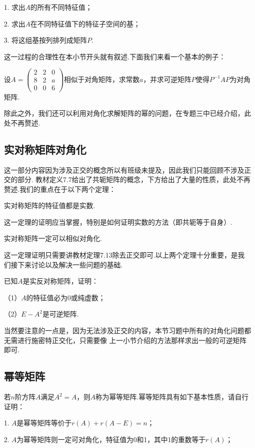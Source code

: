 1. 求出$A$的所有不同特征值；

2. 求出$A$在不同特征值下的特征子空间的基；

3. 将这组基按列排列成矩阵$P$.

这一过程的合理性在本小节开头就有叙述.下面我们来看一个基本的例子：
\begin{example}
	设$A=\begin{pmatrix}
		2 & 2 & 0 \\ 8 & 2 & a \\ 0 & 0 & 6
	\end{pmatrix}$相似于对角矩阵，求常数$a$，并求可逆矩阵$P$使得$P^{-1}AP$为对角矩阵.
\end{example}
除此之外，我们还可以利用对角化求解矩阵的幂的问题，在专题三中已经介绍，此处不再赘述.

\subsection{实对称矩阵对角化}
这一部分内容因为涉及正交的概念所以有班级未提及，因此我们只能回顾不涉及正交的部分.
教材定义7.7给出了共轭矩阵的概念，下方给出了大量的性质，此处不再赘述.我们的重点在于以下两个定理：
\begin{theorem}
	实对称矩阵的特征值都是实数.
\end{theorem}
这一定理的证明应当掌握，特别是如何证明实数的方法（即共轭等于自身）.
\begin{theorem}
	实对称矩阵一定可以相似对角化.
\end{theorem}
这一定理证明只需要讲教材定理7.13除去正交即可.以上两个定理十分重要，是我们接下来讨论以及解决一些问题的基础.
\begin{example}
	已知$A$是实反对称矩阵，证明：

	\textup{（1）}$A$的特征值必为$0$或纯虚数\textup{；}

	\textup{（2）}$E-A^2$是可逆矩阵.
\end{example}
当然要注意的一点是，因为无法涉及正交的内容，本节习题中所有的对角化问题都无需进行施密特正交化，只需要像
上一小节介绍的方法那样求出一般的可逆矩阵即可.
\subsection{幂等矩阵}
若$n$阶方阵$A$满足$A^2=A$，则$A$称为幂等矩阵.幂等矩阵具有如下基本性质，请自行证明：

1. $A$是幂等矩阵等价于$r(A)+r(A-E)=n$；

2. $A$为幂等矩阵则一定可对角化，特征值为0和1，其中1的重数等于$r(A)$；

